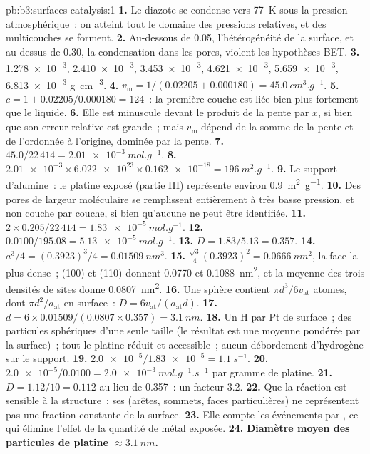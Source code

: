 \begin{solution}{pb:b3:surfaces-catalysis:1}
\textbf{1.} Le diazote se condense vers \qty{77}{K} sous la pression
atmosphérique~: on atteint tout le domaine des pressions relatives, et
des multicouches se forment.
\textbf{2.} Au-dessous de 0.05, l'hétérogénéité de la surface, et
au-dessus de 0.30, la condensation dans les pores, violent les hypothèses
BET.
\textbf{3.} \num{1.278e-3}, \num{2.410e-3}, \num{3.453e-3}, \num{4.621e-3}, \num{5.659e-3}, \num{6.813e-3} \unit{g.cm^{-3}}.
\textbf{4.} $v_{\mathrm m} = 1/(0.02205 + 0.000180) = \qty{45.0}{cm^3.g^{-1}}$.
\textbf{5.} $c = 1 + 0.02205/0.000180 = 124$~: la première couche est
liée bien plus fortement que le liquide.
\textbf{6.} Elle est minuscule devant le produit de la pente par $x$, si
bien que son erreur relative est grande~; mais $v_{\mathrm m}$ dépend de
la somme de la pente et de l'ordonnée à l'origine, dominée par la pente.
\textbf{7.} $45.0/22\,414 = \qty{2.01e-3}{mol.g^{-1}}$.
\textbf{8.} $\num{2.01e-3} \times \num{6.022e23} \times \num{0.162e-18} = \qty{196}{m^2.g^{-1}}$.
\textbf{9.} Le support d'alumine~: le platine exposé (partie III)
représente environ \qty{0.9}{m^2.g^{-1}}.
\textbf{10.} Des pores de largeur moléculaire se remplissent entièrement
à très basse pression, et non couche par couche, si bien qu'aucune
 ne peut être identifiée.
\textbf{11.} $2 \times 0.205/22\,414 = \qty{1.83e-5}{mol.g^{-1}}$.
\textbf{12.} $0.0100/195.08 = \qty{5.13e-5}{mol.g^{-1}}$.
\textbf{13.} $D = 1.83/5.13 = 0.357$.
\textbf{14.} $a^3/4 = (0.3923)^3/4 = \qty{0.01509}{nm^3}$.
\textbf{15.} $\frac{\sqrt3}{4}(0.3923)^2 = \qty{0.0666}{nm^2}$, la face
la plus dense~; (100) et (110) donnent 0.0770 et
\qty{0.1088}{nm^2}, et la moyenne des trois densités de sites donne
\qty{0.0807}{nm^2}.
\textbf{16.} Une sphère contient $\pi d^3/6v_{\mathrm{at}}$ atomes, dont $\pi d^2/a_{\mathrm{at}}$ en surface~:
$D = 6v_{\mathrm{at}}/(a_{\mathrm{at}}d)$.
\textbf{17.} $d = 6 \times 0.01509/(0.0807 \times 0.357) = \qty{3.1}{nm}$.
\textbf{18.} Un H par Pt de surface~; des particules sphériques d'une
seule taille (le résultat est une moyenne pondérée par la surface)~;
tout le platine réduit et accessible~; aucun débordement d'hydrogène
sur le support.
\textbf{19.} $\num{2.0e-5}/\num{1.83e-5} = \qty{1.1}{s^{-1}}$.
\textbf{20.} $\num{2.0e-5}/0.0100 = \qty{2.0e-3}{mol.g^{-1}.s^{-1}}$ par
gramme de platine.
\textbf{21.} $D = 1.12/10 = 0.112$ au lieu de 0.357~: un facteur 3.2.
\textbf{22.} Que la réaction est sensible à la structure~: ses  (arêtes, sommets, faces particulières) ne représentent pas une
fraction constante de la surface.
\textbf{23.} Elle compte les événements par , ce qui élimine
l'effet de la quantité de métal exposée.
\textbf{24.} \textbf{Diamètre moyen des particules de platine
$\approx \qty{3.1}{nm}$.}
\end{solution}

